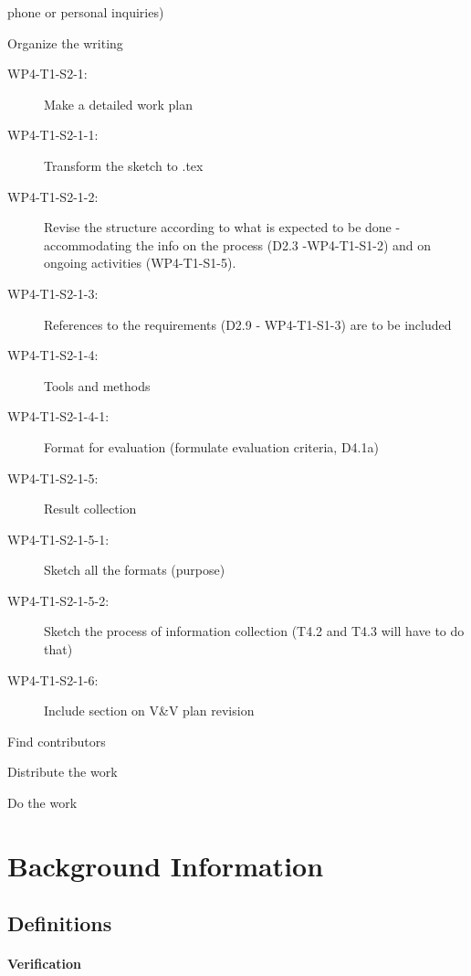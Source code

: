 \documentclass{template/openetcs_report}
\begin{document}
{{\begin{description}
\begin{description}
\begin{description}
      phone or personal inquiries) 
    \end{description}
  \item[WP4-T1-S2:] Organize the writing 
    \begin{description}
    \item[WP4-T1-S2-1:] Make a detailed work plan
    \item[WP4-T1-S2-1-1:] Transform the sketch to .tex
    \item[WP4-T1-S2-1-2:] Revise the structure according to what is
      expected to be done - accommodating the info on the process (D2.3
      -WP4-T1-S1-2) and on ongoing activities  (WP4-T1-S1-5). 
    \item[WP4-T1-S2-1-3:] References to the requirements (D2.9 -
      WP4-T1-S1-3) are to be included 
    \item[WP4-T1-S2-1-4:] Tools and methods
    \item[WP4-T1-S2-1-4-1:] Format for evaluation (formulate
      evaluation criteria, D4.1a) 
    \item[WP4-T1-S2-1-5:] Result collection
    \item[WP4-T1-S2-1-5-1:] Sketch all the formats (purpose)
    \item[WP4-T1-S2-1-5-2:] Sketch the process of information collection
      (T4.2 and T4.3 will have to do that) 
    \item[WP4-T1-S2-1-6:] Include section on V\&V plan revision
    \end{description}
  \item[WP4-T1-S2-2:] Find contributors
  \item[WP4-T1-S2-3:] Distribute the work
  \end{description}
\item[WP4-T1-S3:]  Do the work
\end{description}  
}
}

\section{Background Information}
\label{sec:backgr-inform}


\subsection{Definitions}

\paragraph{Verification}
\end{document}

